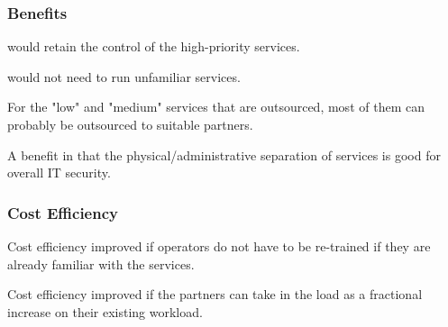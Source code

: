 \documentclass[12pt,a4paper]{article}
\begin{document}
\subsubsection*{Benefits}
\bitm
  \item {\EC would retain the control of the high-priority services.}
  \item {\EC would not need to run unfamiliar services.}
  \item {For the "low" and "medium" services that are outsourced, most of them can probably be outsourced to suitable partners.}
  \item {A benefit in that the physical/administrative separation of services is good for overall IT security.}
\eitm

\subsubsection*{Cost Efficiency}
\bitm
  \item Cost efficiency improved if operators do not have to be re-trained if they are already familiar with the services.
  \item Cost efficiency improved if the partners can take in the \ED load as a fractional increase on their existing workload.
\eitm
\end{document}
